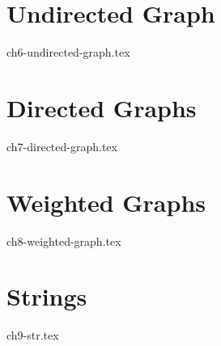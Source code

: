 \documentclass{report}
\begin{document}

\chapter{Undirected Graph}

{ch6-undirected-graph.tex}


\chapter{Directed Graphs}

{ch7-directed-graph.tex}


\chapter{Weighted Graphs}

{ch8-weighted-graph.tex}


\chapter{Strings}

{ch9-str.tex}
\end{document}
